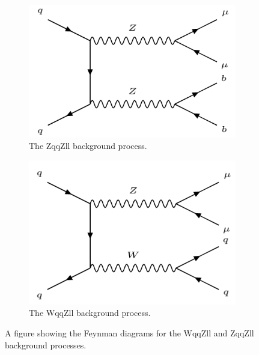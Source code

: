 \documentclass[12pt,a4paper,epsf,portrait,times,epsfig]{article}
\begin{document}
		
		\begin{figure}[h]
			\begin{subfigure}{.49\textwidth}
				\centering
				\includegraphics[scale=0.45]{ZqqZll}
				\caption{The ZqqZll background process.}
				\label{Fig:SFigZqqZllFeynman}
			\end{subfigure}
			\begin{subfigure}{.49\textwidth}
				\centering
				\includegraphics[scale=0.42]{WqqZll}
				\caption{The WqqZll background process.}
				\label{Fig:SFigWqqZllFeynman}
			\end{subfigure}
			\caption{A figure showing the Feynman diagrams for the WqqZll and ZqqZll background processes.}
			\label{Fig:DibosonBackgroundFeynman}
		\end{figure}  
		
\end{document}
